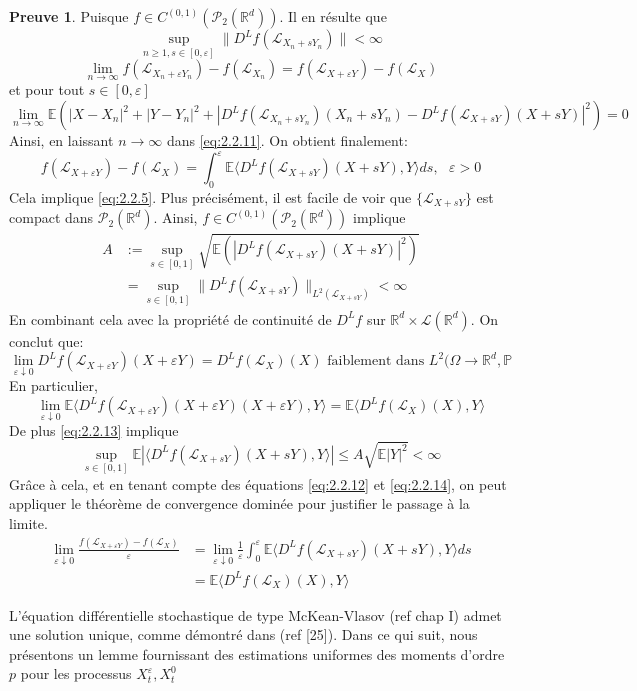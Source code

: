 \documentclass[12pt,a4paper,twoside,fleqn]{book}%
\theoremstyle{definition}
\newtheorem*{pr}{\textbf{Preuve}}
\theoremstyle{lemme}
\numberwithin{equation}{section}
\begin{document}
\begin{pr}
		
	Puisque $f\in C^{(0,1)}(\mathcal{P}_2(\mathbb{R}^d))$. Il en résulte que 
	\[
	\sup_{n\geq 1, s\in[0,\varepsilon]}\|D^Lf(\mathcal{L}_{X_n+s Y_n})\|<\infty
	\]
	\[
	\lim_{n\to \infty}f(\mathcal{L}_{X_n+\varepsilon Y_n}) - f(\mathcal{L}_{X_n}) = f(\mathcal{L}_{X+\varepsilon Y}) - f(\mathcal{L}_X)
	\] et pour tout $s\in[0,\varepsilon]$ 
	\[
	\lim_{n\to \infty}\mathbb{E}\left( |X-X_n|^2 + |Y-Y_n|^2 +|D^Lf(\mathcal{L}_{X_n+sY_n})(X_n+sY_n) - D^Lf(\mathcal{L}_{X+sY})(X+sY)|^2\right) = 0
	\]
	Ainsi, en laissant $n\to\infty$ dans \ref{eq:2.2.11}. On obtient finalement:
	\begin{equation}\label{eq:2.2.12}
		f(\mathcal{L}_{X+\varepsilon Y}) - f(\mathcal{L}_X) = \int_{0}^{\varepsilon}\mathbb{E}\langle D^Lf(\mathcal{L}_{X+sY})(X + sY),Y\rangle ds, \text{    }\varepsilon>0
	\end{equation}	
	Cela implique \ref{eq:2.2.5}. Plus précisément, il est facile de voir que $\{\mathcal{L}_{X+sY}\}$ est compact dans $\mathcal{P}_2(\mathbb{R}^d)$. Ainsi, $f\in C^{(0,1)}(\mathcal{P}_2(\mathbb{R}^d))$ implique	
	\begin{equation}\label{eq:2.2.13}
		\begin{aligned}
		A&:= \sup_{s\in [0,1]}\sqrt{\mathbb{E}\left(|D^Lf(\mathcal{L}_{X+sY})(X+sY)|^2 \right)}\\
		&=\sup_{s\in[0,1]}\|D^Lf(\mathcal{L}_{X+sY})\|_{L^2(\mathcal{L}_{X+sY})} < \infty
		\end{aligned}
	\end{equation}
	En combinant cela avec la propriété de continuité de $D^Lf$ sur $\mathbb{R}^d\times\mathcal{L}(\mathbb{R}^d)$. On conclut que: 
	\[
	\lim_{\varepsilon \downarrow0} D^Lf(\mathcal{L}_{X+\varepsilon Y})(X+\varepsilon Y) = D^Lf(\mathcal{L}_X)(X) \text{ faiblement dans } L^2(\Omega\to \mathbb{R}^d,\mathbb{P}
	\]
	En particulier,	
	\begin{equation}\label{eq:2.2.14}
		\lim_{\varepsilon\downarrow 0} \mathbb{E}\langle D^Lf(\mathcal{L}_{X+\varepsilon Y})(X+\varepsilon Y)(X + \varepsilon Y),Y\rangle = \mathbb{E}\langle D^Lf(\mathcal{L}_X)(X),Y\rangle
	\end{equation}
	De plus \ref{eq:2.2.13} implique
	\[
	\sup_{s\in[0,1]}\mathbb{E}|\langle D^Lf(\mathcal{L}_{X+sY})(X+sY),Y\rangle| \leq A\sqrt{\mathbb{E}|Y|^2}< \infty
	\]
	Grâce à cela, et en tenant compte des équations \ref{eq:2.2.12} et \ref{eq:2.2.14}, on peut appliquer le théorème de convergence dominée pour justifier le passage à la limite.
	\[
	\begin{aligned}
	\lim_{\varepsilon\downarrow0}\frac{f(\mathcal{L}_{X+\varepsilon Y})-f(\mathcal{L}_X)}{\varepsilon} &= \lim_{\varepsilon\downarrow0}\frac{1}{\varepsilon}\int_{0}^{\varepsilon}\mathbb{E}\langle D^Lf(\mathcal{L}_{X+sY})(X+sY),Y\rangle ds\\
		&= \mathbb{E}\langle D^Lf(\mathcal{L}_X)(X),Y\rangle
	\end{aligned}
	\]
	
\end{pr}
L'équation différentielle stochastique de type McKean-Vlasov (ref chap I) admet une solution unique, comme démontré dans (ref [25]). Dans ce qui suit, nous présentons un lemme fournissant des estimations uniformes des moments d'ordre $p$ pour les processus $X_t^\varepsilon,X_t^0$ 
\end{document}
